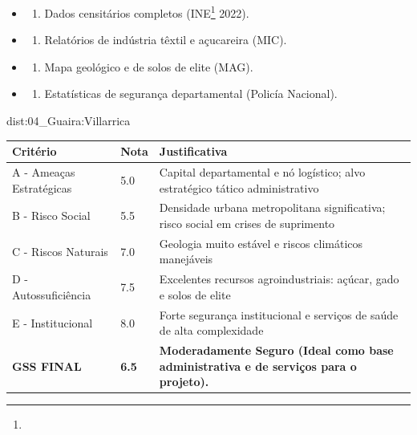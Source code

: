 {\begin{itemize}
\tightlist
\item
  \begin{enumerate}
  \def\labelenumi{\arabic{enumi})}
  \tightlist
  \item
    Dados censitários completos (INE\footnote{\fineINE} 2022).
  \end{enumerate}
\item
  \begin{enumerate}
  \def\labelenumi{\arabic{enumi})}
  \setcounter{enumi}{1}
  \tightlist
  \item
    Relatórios de indústria têxtil e açucareira (MIC).
  \end{enumerate}
\item
  \begin{enumerate}
  \def\labelenumi{\arabic{enumi})}
  \setcounter{enumi}{2}
  \tightlist
  \item
    Mapa geológico e de solos de elite (MAG).
  \end{enumerate}
\item
  \begin{enumerate}
  \def\labelenumi{\arabic{enumi})}
  \setcounter{enumi}{3}
  \tightlist
  \item
    Estatísticas de segurança departamental (Policía Nacional).
  \end{enumerate}
\end{itemize}}{dist:04_Guaira:Villarrica}
\begin{table}[ht!]
\small \begin{tabular}{p{3.0cm}p{0.8cm}p{6.0cm}} \toprule
\textbf{Critério} & \textbf{Nota} & \textbf{Justificativa} \\ \midrule
A - Ameaças Estratégicas & 5.0 & Capital departamental e nó logístico; alvo estratégico tático administrativo \\
B - Risco Social & 5.5 & Densidade urbana metropolitana significativa; risco social em crises de suprimento \\
C - Riscos Naturais & 7.0 & Geologia muito estável e riscos climáticos manejáveis \\
D - Autossuficiência & 7.5 & Excelentes recursos agroindustriais: açúcar, gado e solos de elite \\
E - Institucional & 8.0 & Forte segurança institucional e serviços de saúde de alta complexidade \\
\midrule \textbf{GSS FINAL} & \textbf{6.5} & \textbf{Moderadamente Seguro (Ideal como base administrativa e de serviços para o projeto).} \\ \bottomrule \end{tabular}
\end{table}
